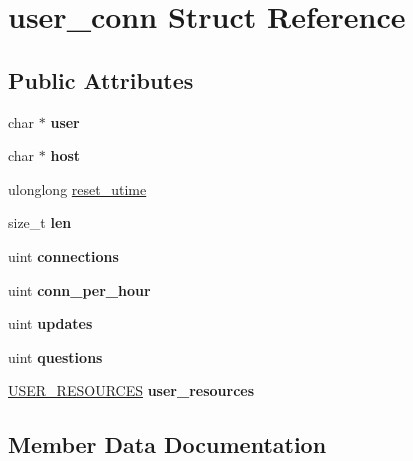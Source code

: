 \hypertarget{structuser__conn}{}\section{user\+\_\+conn Struct Reference}
\label{structuser__conn}
\subsection*{Public Attributes}
\begin{DoxyCompactItemize}
\item 
\mbox{\label{structuser__conn_a0e677397fa2ff563a6ce0c7abfbe317b}} 
char $\ast$ {\bfseries user}
\item 
\mbox{\label{structuser__conn_a4f80e9327ec31b86ee2bf5c47b39411b}} 
char $\ast$ {\bfseries host}
\item 
ulonglong \mbox{\hyperlink{structuser__conn_ab8f60b51880f470f11301a75ee5d448c}{reset\+\_\+utime}}
\item 
\mbox{\label{structuser__conn_ae62e2d52f6fceb3115e377398d54cfdd}} 
size\+\_\+t {\bfseries len}
\item 
\mbox{\label{structuser__conn_abb8370f7b02df7fcf3ac41a29ae70e6e}} 
uint {\bfseries connections}
\item 
\mbox{\label{structuser__conn_a5a6bbaad4da8167e4af963d522571f61}} 
uint {\bfseries conn\+\_\+per\+\_\+hour}
\item 
\mbox{\label{structuser__conn_a0b3427e435d823fc79e02b1bb41feb57}} 
uint {\bfseries updates}
\item 
\mbox{\label{structuser__conn_adf58df5b67fd20cb62489ee17649092a}} 
uint {\bfseries questions}
\item 
\mbox{\label{structuser__conn_a68d09e087c78bc3e36b0fd794d1f91ef}} 
\mbox{\hyperlink{structuser__resources}{U\+S\+E\+R\+\_\+\+R\+E\+S\+O\+U\+R\+C\+ES}} {\bfseries user\+\_\+resources}
\end{DoxyCompactItemize}


\subsection{Member Data Documentation}
\mbox{\label{structuser__conn_ab8f60b51880f470f11301a75ee5d448c}} 
